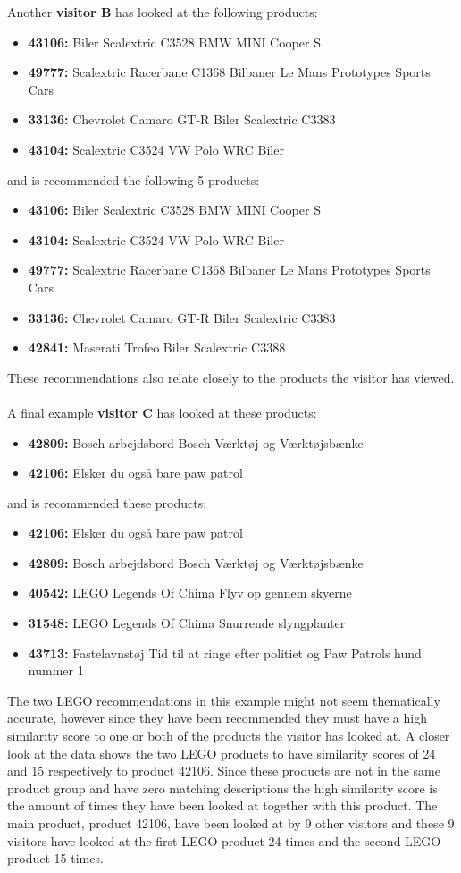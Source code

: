 Another \textbf{visitor B} has looked at the following products:
\begin{itemize}
\item \textbf{43106: }Biler Scalextric C3528 BMW MINI Cooper S
\item \textbf{49777: }Scalextric Racerbane C1368 Bilbaner Le Mans Prototypes Sports Cars
\item \textbf{33136: }Chevrolet Camaro GT-R Biler Scalextric C3383 
\item \textbf{43104: }Scalextric C3524 VW Polo WRC Biler
\end{itemize}
and is recommended the following 5 products:
\begin{itemize}
\item \textbf{43106: }Biler Scalextric C3528 BMW MINI Cooper S
\item \textbf{43104: }Scalextric C3524 VW Polo WRC Biler
\item \textbf{49777: }Scalextric Racerbane C1368 Bilbaner Le Mans Prototypes Sports Cars
\item \textbf{33136: }Chevrolet Camaro GT-R Biler Scalextric C3383
\item \textbf{42841: }Maserati Trofeo Biler Scalextric C3388
\end{itemize}

These recommendations also relate closely to the products the visitor has viewed. \\\\

A final example \textbf{visitor C} has looked at these products:
\begin{itemize}
\item \textbf{42809: }Bosch arbejdsbord Bosch Værktøj og Værktøjsbænke
\item \textbf{42106: }Elsker du også bare paw patrol
\end{itemize}
and is recommended these products:
\begin{itemize}
\item \textbf{42106: }Elsker du også bare paw patrol
\item \textbf{42809: }Bosch arbejdsbord Bosch Værktøj og Værktøjsbænke
\item \textbf{40542: }LEGO Legends Of Chima Flyv op gennem skyerne
\item \textbf{31548:} LEGO Legends Of Chima Snurrende slyngplanter
\item \textbf{43713:} Fastelavnstøj Tid til at ringe efter politiet og Paw Patrols hund nummer 1
\end{itemize}
The two LEGO recommendations in this example might not seem thematically accurate, however since they have been recommended they must have a high similarity score to one or both of the products the visitor has looked at. A closer look at the data shows the two LEGO products to have similarity scores of 24 and 15 respectively to product 42106. Since these products are not in the same product group and have zero matching descriptions the high similarity score is the amount of times they have been looked at together with this product. The main product, product 42106, have been looked at by 9 other visitors and these 9 visitors have looked at the first LEGO product 24 times and the second LEGO product 15 times.

